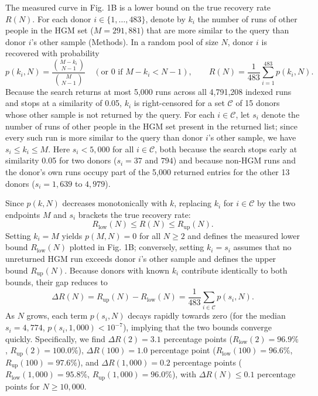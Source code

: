 \documentclass[11pt,a4paper]{article}
\begin{document}
The measured curve in Fig. 1B is a lower bound on the true recovery rate $R(N)$. For each donor $i \in \{1,\dots,483\}$, denote by $k_i$ the number of runs of other people in the HGM set ($M = 291{,}881$) that are more similar to the query than donor $i$'s other sample (Methods). In a random pool of size $N$, donor $i$ is recovered with probability
\[
    p(k_i, N) = \frac{\binom{M - k_i}{N - 1}}{\binom{M}{N - 1}} \quad (\text{or } 0 \text{ if } M - k_i < N - 1), \qquad R(N) = \frac{1}{483}\sum_{i=1}^{483} p(k_i, N).
\]
Because the search returns at most 5,000 runs across all 4,791,208 indexed runs and stops at a similarity of 0.05, $k_i$ is right-censored for a set $\mathcal{C}$ of 15 donors whose other sample is not returned by the query. For each $i \in \mathcal{C}$, let $s_i$ denote the number of runs of other people in the HGM set present in the returned list; since every such run is more similar to the query than donor $i$'s other sample, we have $s_i \le k_i \le M$. Here $s_i < 5{,}000$ for all $i \in \mathcal{C}$, both because the search stops early at similarity 0.05 for two donors ($s_i = 37$ and $794$) and because non-HGM runs and the donor's own runs occupy part of the 5,000 returned entries for the other 13 donors ($s_i = 1{,}639$ to $4{,}979$).

Since $p(k, N)$ decreases monotonically with $k$, replacing $k_i$ for $i \in \mathcal{C}$ by the two endpoints $M$ and $s_i$ brackets the true recovery rate:
\[
    R_{\mathrm{low}}(N) \le R(N) \le R_{\mathrm{up}}(N).
\]
Setting $k_i = M$ yields $p(M, N) = 0$ for all $N \ge 2$ and defines the measured lower bound $R_{\mathrm{low}}(N)$ plotted in Fig. 1B; conversely, setting $k_i = s_i$ assumes that no unreturned HGM run exceeds donor $i$'s other sample and defines the upper bound $R_{\mathrm{up}}(N)$. Because donors with known $k_i$ contribute identically to both bounds, their gap reduces to
\[
    \Delta R(N) = R_{\mathrm{up}}(N) - R_{\mathrm{low}}(N) = \frac{1}{483}\sum_{i \in \mathcal{C}} p(s_i, N).
\]
As $N$ grows, each term $p(s_i, N)$ decays rapidly towards zero (for the median $s_i = 4{,}774$, $p(s_i, 1{,}000) < 10^{-7}$), implying that the two bounds converge quickly. Specifically, we find $\Delta R(2) = 3.1$ percentage points ($R_{\mathrm{low}}(2) = 96.9\%$, $R_{\mathrm{up}}(2) = 100.0\%$), $\Delta R(100) = 1.0$ percentage point ($R_{\mathrm{low}}(100) = 96.6\%$, $R_{\mathrm{up}}(100) = 97.6\%$), and $\Delta R(1{,}000) = 0.2$ percentage points ($R_{\mathrm{low}}(1{,}000) = 95.8\%$, $R_{\mathrm{up}}(1{,}000) = 96.0\%$), with $\Delta R(N) \le 0.1$ percentage points for $N \ge 10{,}000$.
\end{document}
